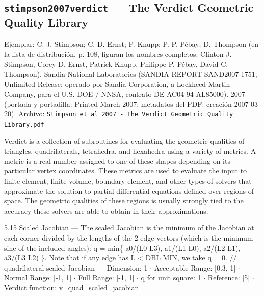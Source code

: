 \documentclass[11pt,a4paper]{article}
\newcommand{\campo}[1]{\textcolor{gris}{\footnotesize #1}}
\begin{document}
\subsection{\texttt{stimpson2007verdict} --- The Verdict Geometric Quality Library}
{\footnotesize\campo{Ejemplar:} C. J. Stimpson; C. D. Ernst; P. Knupp; P. P. Pébay; D. Thompson (en la lista de distribución, p. 108, figuran los nombres completos: Clinton J. Stimpson, Corey D. Ernst, Patrick Knupp, Philippe P. Pébay, David C. Thompson). Sandia National Laboratories (SANDIA REPORT SAND2007-1751, Unlimited Release; operado por Sandia Corporation, a Lockheed Martin Company, para el U.S. DOE / NNSA, contrato DE-AC04-94-AL85000). 2007 (portada y portadilla: \textquotedbl{}Printed March 2007\textquotedbl{}; metadatos del PDF: creación 2007-03-20). \campo{Archivo:} \texttt{Stimpson et al 2007 - The Verdict Geometric Quality Library.pdf}\par}\vspace{4pt}
\vspace{3pt}\noindent{\small\textbf{p.\ 3} \quad \campo{«La precisión del resultado depende de la calidad geométrica de los elementos. EduFEM evalúa dos métricas ortogonales tomadas de la biblioteca de calidad geométrica Verdict» --- tesis/capitulos/02\_marco\_teorico.tex:362}}\par
\begin{pasaje}\footnotesize Verdict is a collection of subroutines for evaluating the geometric qualities of triangles, quadrilaterals, tetrahedra, and hexahedra using a variety of metrics. A metric is a real number assigned to one of these shapes depending on its particular vertex coordinates. These metrics are used to evaluate the input to finite element, finite volume, boundary element, and other types of solvers that approximate the solution to partial differential equations defined over regions of space. The geometric qualities of these regions is usually strongly tied to the accuracy these solvers are able to obtain in their approximations.\end{pasaje}
\vspace{3pt}\noindent{\small\textbf{p.\ 51} \quad \campo{El Jacobiano escalado «equivale al seno del ángulo local entre ambas tangentes y vive en el rango \$[-1,1]\$»; y «el módulo M0 emplea la forma por vértices de Verdict ---el seno del ángulo interior en cada esquina, tomando el peor---» --- tesis/capitulos/02\_marco\_teorico.tex:362-374}}\par
\begin{pasaje}\footnotesize 5.15 Scaled Jacobian --- The scaled Jacobian is the minimum of the Jacobian at each corner divided by the lengths of the 2 edge vectors (which is the minimum sine of the included angles): q = min\{ a0/(L0 L3), a1/(L1 L0), a2/(L2 L1), a3/(L3 L2) \}. Note that if any edge has \textbar{}L\textbar{} \textless{} DBL MIN, we take q = 0. // quadrilateral scaled Jacobian --- Dimension: 1 $\cdot$ Acceptable Range: [0.3, 1] $\cdot$ Normal Range: [-1, 1] $\cdot$ Full Range: [-1, 1] $\cdot$ q for unit square: 1 $\cdot$ Reference: [5] $\cdot$ Verdict function: v\_quad\_scaled\_jacobian\end{pasaje}
\end{document}
